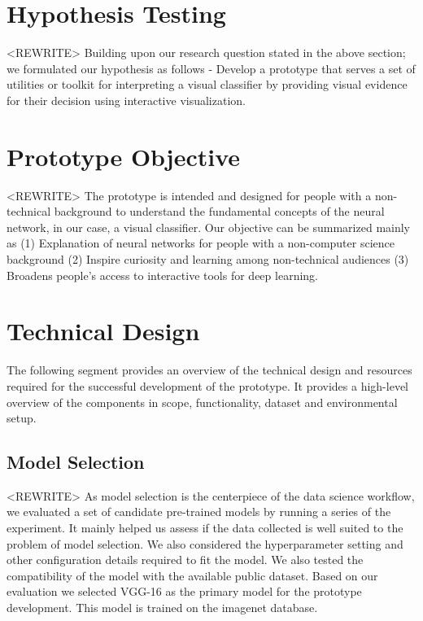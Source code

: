 \section{Hypothesis Testing}

<REWRITE> Building upon our research question stated in the above section; we formulated our hypothesis as follows -  Develop a prototype that serves a set of utilities or toolkit for interpreting a visual classifier by providing visual evidence for their decision using interactive visualization.

\section{Prototype Objective}

<REWRITE> The prototype is intended and designed for people with a non-technical background to understand the fundamental concepts of the neural network, in our case, a visual classifier. Our objective can be summarized mainly as (1) Explanation of neural networks for people with a non-computer science background (2) Inspire curiosity and learning among non-technical audiences  (3) Broadens people's access to interactive tools for deep learning.

\section{Technical Design}
The following segment provides an overview of the technical design and resources required for the successful development of the prototype. It provides a high-level overview of the components in scope, functionality, dataset and environmental setup.

\subsection{Model Selection}

<REWRITE> As model selection is the centerpiece of the data science workflow, we evaluated a set of candidate pre-trained models by running a series of the experiment. It mainly helped us assess if the data collected is well suited to the problem of model selection. We also considered the hyperparameter setting and other configuration details required to fit the model. We also tested the compatibility of the model with the available public dataset. Based on our evaluation we selected VGG-16 as the primary model for the prototype development. This model is trained on the imagenet database.

